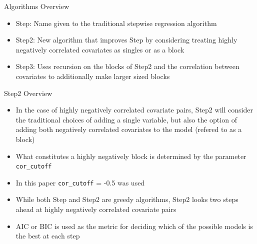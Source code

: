 \documentclass[ignorenonframetext,]{beamer}
\providecommand{\tightlist}{%
  \setlength{\itemsep}{0pt}\setlength{\parskip}{0pt}}
\begin{document}
\begin{frame}{Algorithms Overview}

\begin{itemize}
\tightlist
\item
  Step: Name given to the traditional stepwise regression algorithm
\item
  Step2: New algorithm that improves Step by considering treating highly
  negatively correlated covariates as singles or as a block
\item
  Step3: Uses recursion on the blocks of Step2 and the correlation
  between covariates to additionally make larger sized blocks
\end{itemize}

\end{frame}

\begin{frame}[fragile]{Step2 Overview}

\begin{itemize}
\tightlist
\item
  In the case of highly negatively correlated covariate pairs, Step2
  will consider the traditional choices of adding a single variable, but
  also the option of adding both negatively correlated covariates to the
  model (refered to as a block)
\item
  What constitutes a highly negatively block is determined by the
  parameter \texttt{cor\_cutoff}
\item
  In this paper \texttt{cor\_cutoff} = -0.5 was used
\item
  While both Step and Step2 are greedy algorithms, Step2 looks two steps
  ahead at highly negatively correlated covariate pairs
\item
  AIC or BIC is used as the metric for deciding which of the possible
  models is the best at each step
\end{itemize}

\end{frame}
\end{document}
